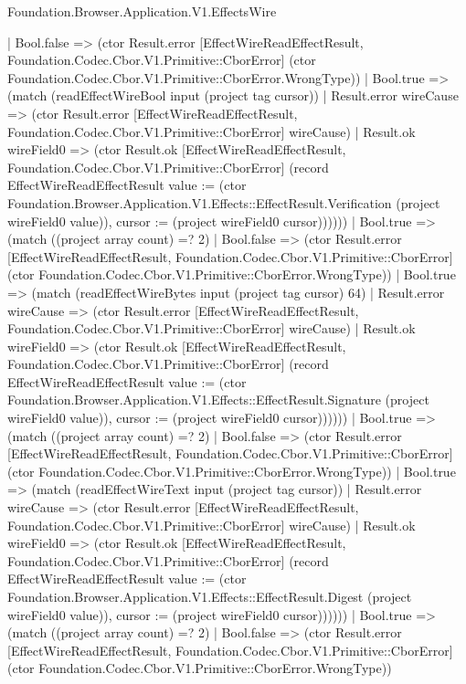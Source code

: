 \begin{lexlean}{Foundation.Browser.Application.V1.EffectsWire}
\begin{semanticmodule}
{                  | Bool.false => (ctor Result.error [EffectWireReadEffectResult, Foundation.Codec.Cbor.V1.Primitive::CborError] (ctor Foundation.Codec.Cbor.V1.Primitive::CborError.WrongType))
                  | Bool.true => (match (readEffectWireBool input (project tag cursor))
                    | Result.error wireCause => (ctor Result.error [EffectWireReadEffectResult, Foundation.Codec.Cbor.V1.Primitive::CborError] wireCause)
                    | Result.ok wireField0 => (ctor Result.ok [EffectWireReadEffectResult, Foundation.Codec.Cbor.V1.Primitive::CborError] (record EffectWireReadEffectResult {value := (ctor Foundation.Browser.Application.V1.Effects::EffectResult.Verification (project wireField0 value)), cursor := (project wireField0 cursor)})))))
              | Bool.true => (match ((project array count) =? 2)
                | Bool.false => (ctor Result.error [EffectWireReadEffectResult, Foundation.Codec.Cbor.V1.Primitive::CborError] (ctor Foundation.Codec.Cbor.V1.Primitive::CborError.WrongType))
                | Bool.true => (match (readEffectWireBytes input (project tag cursor) 64)
                  | Result.error wireCause => (ctor Result.error [EffectWireReadEffectResult, Foundation.Codec.Cbor.V1.Primitive::CborError] wireCause)
                  | Result.ok wireField0 => (ctor Result.ok [EffectWireReadEffectResult, Foundation.Codec.Cbor.V1.Primitive::CborError] (record EffectWireReadEffectResult {value := (ctor Foundation.Browser.Application.V1.Effects::EffectResult.Signature (project wireField0 value)), cursor := (project wireField0 cursor)})))))
            | Bool.true => (match ((project array count) =? 2)
              | Bool.false => (ctor Result.error [EffectWireReadEffectResult, Foundation.Codec.Cbor.V1.Primitive::CborError] (ctor Foundation.Codec.Cbor.V1.Primitive::CborError.WrongType))
              | Bool.true => (match (readEffectWireText input (project tag cursor))
                | Result.error wireCause => (ctor Result.error [EffectWireReadEffectResult, Foundation.Codec.Cbor.V1.Primitive::CborError] wireCause)
                | Result.ok wireField0 => (ctor Result.ok [EffectWireReadEffectResult, Foundation.Codec.Cbor.V1.Primitive::CborError] (record EffectWireReadEffectResult {value := (ctor Foundation.Browser.Application.V1.Effects::EffectResult.Digest (project wireField0 value)), cursor := (project wireField0 cursor)})))))
          | Bool.true => (match ((project array count) =? 2)
            | Bool.false => (ctor Result.error [EffectWireReadEffectResult, Foundation.Codec.Cbor.V1.Primitive::CborError] (ctor Foundation.Codec.Cbor.V1.Primitive::CborError.WrongType))
}
\end{semanticmodule}
\end{lexlean}
